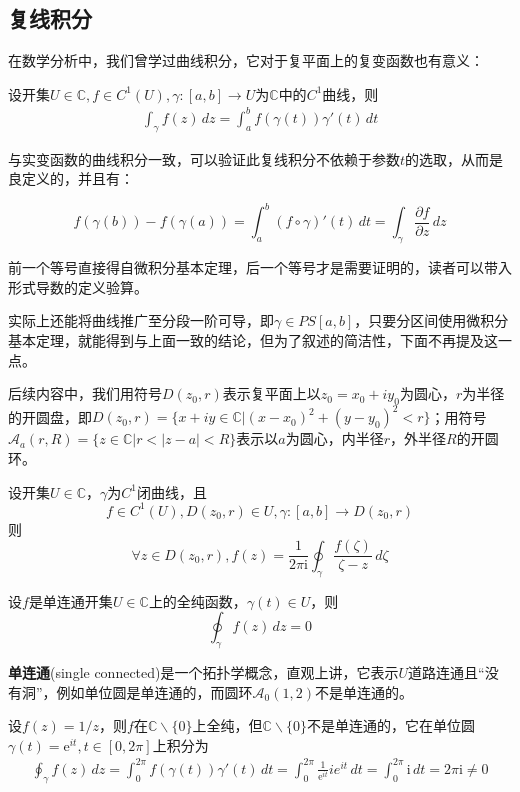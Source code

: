 \documentclass{ctexbook}
\begin{document}
\subsection{复线积分}\label{sub:line_integral}
在数学分析中，我们曾学过曲线积分，它对于复平面上的复变函数也有意义：
\begin{definition}[复线积分]
    设开集$U\in\mathbb{C},f\in C^1(U),\gamma:[a,b]\to U$为$\mathbb{C}$中的$C^1$曲线，则
    \begin{align*}
        \int_{\gamma}f(z)\,dz=\int_a^bf(\gamma(t))\gamma'(t)\,dt
    \end{align*}
\end{definition}

与实变函数的曲线积分一致，可以验证此复线积分不依赖于参数$t$的选取，从而是良定义的，并且有：\begin{proposition}
    \[f(\gamma(b))-f(\gamma(a))=\int_{a}^{b}(f\circ \gamma)'(t)\,dt=\int_{\gamma}\frac{\partial f}{\partial z}\,dz\]
\end{proposition}
\begin{remark}
    前一个等号直接得自微积分基本定理，后一个等号才是需要证明的，读者可以带入形式导数的定义验算。
\end{remark}
实际上还能将曲线推广至分段一阶可导，即$\gamma\in PS[a,b]$，只要分区间使用微积分基本定理，就能得到与上面一致的结论，但为了叙述的简洁性，下面不再提及这一点。

后续内容中，我们用符号$D(z_0,r)$表示复平面上以$z_0=x_0+iy_0$为圆心，$r$为半径的开圆盘，即$D(z_0,r)=\{x+iy\in\mathbb{C}\big| (x-x_0)^2+(y-y_0)^2<r\}$；用符号$\mathcal{A} _a(r,R)=\{z\in\mathbb{C}|r<|z-a|<R\}$表示以$a$为圆心，内半径$r$，外半径$R$的开圆环。
\begin{theorem}[柯西积分公式]
    设开集$U\in\mathbb{C}$，$\gamma$为$C^1$闭曲线，且$$f\in C^1(U),D(z_0,r)\in U,\gamma:[a,b]\to D(z_0,r)$$则
    \[\forall z\in D(z_0,r),f(z)=\frac{1}{2\pi \mathrm{i}}\oint_{\gamma}\frac{f(\zeta)}{\zeta-z}\,d\zeta\]
\end{theorem}
\begin{theorem}[柯西积分定理]
    设$f$是单连通开集$U\in\mathbb{C}$上的全纯函数，$\gamma(t)\in U$，则
    \[\oint_{\gamma}f(z)\,dz=0\]
\end{theorem}
\begin{remark}
    \textbf{单连通}(single connected)是一个拓扑学概念，直观上讲，它表示$U$道路连通且“没有洞”，例如单位圆是单连通的，而圆环$\mathcal{A}_0(1,2)$不是单连通的。
\end{remark}
\begin{example}
设$f(z)=1/z$，则$f$在$\mathbb{C}\backslash\{0\}$上全纯，但$\mathbb{C}\backslash\{0\}$不是单连通的，它在单位圆$\gamma(t)=\mathrm{e}^{it},t\in[0,2\pi]$上积分为\begin{align*}
    \oint_{\gamma}f(z)\,dz=\int_0^{2\pi}f(\gamma(t))\gamma'(t)\,dt=\int_0^{2\pi}\frac{1}{\mathrm{e}^{it}}ie^{it}\,dt=\int_0^{2\pi}\mathrm{i}\,dt=2\pi \mathrm{i}\neq 0
\end{align*}
\end{example}
\end{document}
